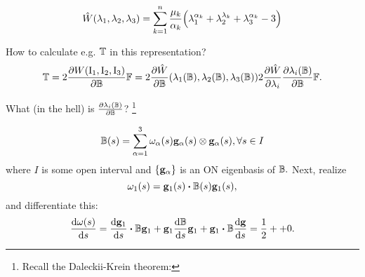 \documentclass[reqno, a4paper]{article}
\begin{document}
\begin{example}
	\[
		\hat{W}\qty(\lambda_1,\lambda_2,\lambda_3) = \sum_{k=1}^n \frac{\mu_k}{\alpha_k}\qty(\lambda_1^{\alpha_k}+\lambda_2^{\lambda_k}+\lambda_3^{\alpha_k}-3)
	\]
\end{example}
How to calculate e.g. $\mathbb{T}$ in this representation?
\[
	\mathbb{T} = 2 \pdv{W\qty(\operatorname{I_1}, \operatorname{I_2}, \operatorname{I_3})}{\ensuremath{\mathbb{B}}}\mathbb{F} = 2 \pdv{\hat{W}}{\ensuremath{\mathbb{B}}}\qty(\lambda_1\qty(\mathbb{B}), \lambda_2\qty(\mathbb{B}), \lambda_3\qty(\mathbb{B})) 2 \pdv{\hat{W}}{\lambda_i}\pdv{\lambda_i\qty(\ensuremath{\mathbb{B}})}{\ensuremath{\mathbb{B}}}\mathbb{F}.
\]

What (in the hell) is $\pdv{\lambda_i\qty(\ensuremath{\mathbb{B}})}{\ensuremath{\mathbb{B}}}$? \footnote{Recall the Daleckii-Krein theorem:}

\[
	\mathbb{B}(s) = \sum_{\alpha = 1}^3 \omega_{\alpha}(s) \vb{g}_{\alpha}(s) \otimes \vb{g}_{\alpha}(s), \forall s \in I
\]
where $I$ is some open interval and $\{\vb{g}_{\alpha}\}$ is an ON eigenbasis of $\mathbb{B}.$ Next, realize
\[
	\omega_1(s) = \vb{g}_1(s)\vdot \lcg(s) \vb{g}_1(s),
\]
and differentiate this:
\[
	\dv{\omega(s)}{s} = \dv{\vb{g}_1}{s}\vdot \lcg \vb{g}_1  + \vb{g}_1 \dv{\lcg}{s}\vb{g}_1+\vb{g}_1 \vdot \lcg \dv{\vb{g}}{s} = \frac{1}{2} + +0.
\]

\end{document}
